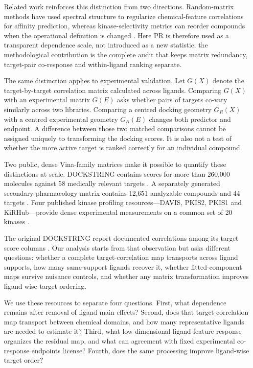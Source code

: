 \documentclass[11pt]{article}
\begin{document}
Related work reinforces this distinction from two directions. Random-matrix methods have
used spectral structure to regularize chemical-feature correlations for affinity prediction,
whereas kinase-selectivity metrics can reorder compounds when the operational definition is
changed \cite{lee2016,graczyk2007,bosc2017}. Here PR is therefore used as a transparent dependence
scale, not introduced as a new statistic; the methodological contribution is the complete
audit that keeps matrix redundancy, target-pair co-response and within-ligand ranking
separate.

The same distinction applies to experimental validation. Let $G(X)$ denote the
target-by-target correlation matrix calculated across ligands. Comparing $G(X)$ with an
experimental matrix $G(E)$ asks whether pairs of targets co-vary similarly across two
libraries. Comparing a centred docking geometry $G_R(X)$ with a centred experimental
geometry $G_R(E)$ changes both predictor and endpoint. A difference between those two
matched comparisons cannot be assigned uniquely to transforming the docking scores. It is
also not a test of whether the more active target is ranked correctly for an individual
compound.

Two public, dense Vina-family matrices make it possible to quantify these distinctions at
scale. DOCKSTRING contains scores for more than 260,000 molecules against 58 medically
relevant targets \cite{dockstring2022}. A separately generated secondary-pharmacology matrix contains 12,651
analyzable compounds and 44 targets \cite{nikitin2025}. Four published kinase profiling resources---DAVIS, PKIS2, PKIS1 and
KiRHub---provide dense experimental measurements on a common set of 20 kinases
\cite{davis2011,drewry2017,elkins2016,saifudeen2026}.

The original DOCKSTRING report documented correlations among its target score columns
\cite{dockstring2022}. Our analysis starts from that observation but asks different questions:
whether a complete target-correlation map transports across ligand supports, how many
same-support ligands recover it, whether fitted-component maps survive nuisance controls,
and whether any matrix transformation improves ligand-wise target ordering.

We use these resources to separate four questions. First, what dependence remains after
removal of ligand main effects? Second, does that target-correlation map transport between
chemical domains, and how many representative ligands are needed to estimate it? Third,
what low-dimensional ligand-feature response organizes the residual map, and what can
agreement with fixed experimental co-response endpoints license? Fourth, does the same
processing improve ligand-wise target order?
\end{document}
